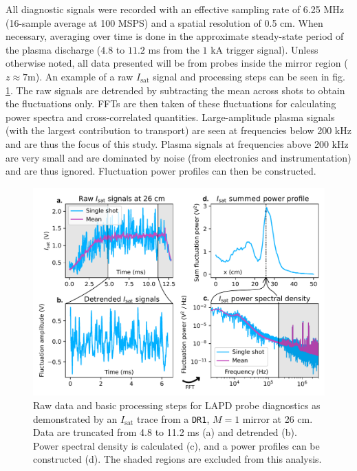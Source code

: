 All diagnostic signals were recorded with an effective sampling rate of 6.25 MHz (16-sample average at 100 MSPS) and a spatial resolution of 0.5 cm. When necessary, averaging over time is done in the approximate steady-state period of the plasma discharge ($4.8$ to $11.2$ ms from the $1$ kA trigger signal). Unless otherwise noted, all data presented will be from probes inside the mirror region ($z \approx 7$m). An example of a raw $I_\text{sat}$ signal and processing steps can be seen in fig. \ref{fig:raw-signals-plots}. The raw signals are detrended by subtracting the mean across shots to obtain the fluctuations only. FFTs are then taken of these fluctuations for calculating power spectra and cross-correlated quantities. Large-amplitude plasma signals (with the largest contribution to transport) are seen at frequencies below 200 kHz and are thus the focus of this study. Plasma signals at frequencies above 200 kHz are very small and are dominated by noise (from electronics and instrumentation) and are thus ignored. Fluctuation power profiles can then be constructed.

\begin{figure}
    \centering
    \includegraphics[width=\textwidth]{figures/fig2.pdf}
    \caption[Raw data processing steps]{Raw data and basic processing steps for LAPD probe diagnostics as demonstrated by an $I_\text{sat}$ trace from a \texttt{DR1}, $M=1$ mirror at 26 cm. Data are truncated from 4.8 to 11.2 ms (a) and detrended (b). Power spectral density is calculated (c), and a power profiles can be constructed (d). The shaded regions are excluded from this analysis.}
    \label{fig:raw-signals-plots}
\end{figure}

